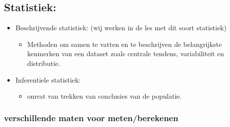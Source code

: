 \documentclass[12pt]{article}
\begin{document}
\subsection{Statistiek:}
\begin{itemize}
    \item Beschrijvende statistiek: (wij werken in de les met dit soort statistiek)\begin{itemize}
        \item  Methoden om samen te vatten en te beschrijven de belangrijkste kenmerken van een dataset zoals centrale tendens, variabiliteit en distributie.
    \end{itemize}
    \item Inferentiele statistiek:\begin{itemize}
        \item omvat van trekken van conclusies van de populatie.
    \end{itemize}
\end{itemize}
\subsubsection{verschillende maten voor meten/berekenen}
\end{document}
